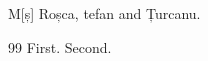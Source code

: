 \documentclass{article}
\begin{document}
M[\meaning ș] Roșca, tefan and Țurcanu.
\begin{thebibliography}{99}
 First.
 Second.
\end{thebibliography}
\end{document}
